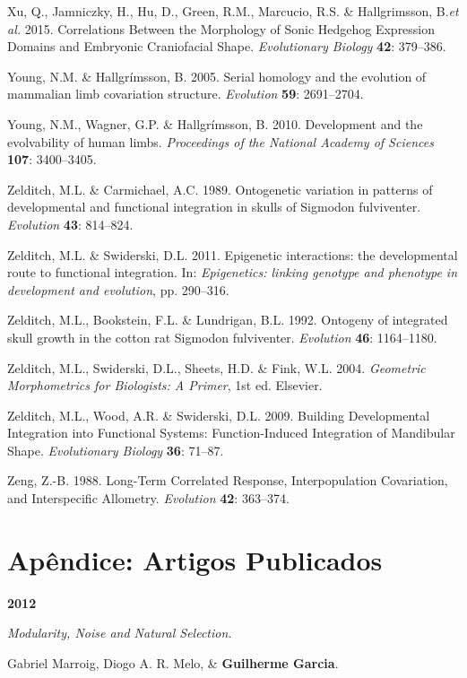 \documentclass[12pt,twoside]{report}
\begin{document}
Xu, Q., Jamniczky, H., Hu, D., Green, R.M., Marcucio, R.S. \&
Hallgrimsson, B.\emph{et al.} 2015. Correlations Between the Morphology
of Sonic Hedgehog Expression Domains and Embryonic Craniofacial Shape.
\emph{Evolutionary Biology} \textbf{42}: 379--386.

Young, N.M. \& Hallgrímsson, B. 2005. Serial homology and the evolution
of mammalian limb covariation structure. \emph{Evolution} \textbf{59}:
2691--2704.

Young, N.M., Wagner, G.P. \& Hallgrímsson, B. 2010. Development and the
evolvability of human limbs. \emph{Proceedings of the National Academy
of Sciences} \textbf{107}: 3400--3405.

Zelditch, M.L. \& Carmichael, A.C. 1989. Ontogenetic variation in
patterns of developmental and functional integration in skulls of
Sigmodon fulviventer. \emph{Evolution} \textbf{43}: 814--824.

Zelditch, M.L. \& Swiderski, D.L. 2011. Epigenetic interactions: the
developmental route to functional integration. In: \emph{Epigenetics:
linking genotype and phenotype in development and evolution}, pp.
290--316.

Zelditch, M.L., Bookstein, F.L. \& Lundrigan, B.L. 1992. Ontogeny of
integrated skull growth in the cotton rat Sigmodon fulviventer.
\emph{Evolution} \textbf{46}: 1164--1180.

Zelditch, M.L., Swiderski, D.L., Sheets, H.D. \& Fink, W.L. 2004.
\emph{Geometric Morphometrics for Biologists: A Primer}, 1st ed.
Elsevier.

Zelditch, M.L., Wood, A.R. \& Swiderski, D.L. 2009. Building
Developmental Integration into Functional Systems: Function-Induced
Integration of Mandibular Shape. \emph{Evolutionary Biology}
\textbf{36}: 71--87.

Zeng, Z.-B. 1988. Long-Term Correlated Response, Interpopulation
Covariation, and Interspecific Allometry. \emph{Evolution} \textbf{42}:
363--374.

\chapter*{Apêndice: Artigos Publicados}

\textbf {2012}

\textit {Modularity, Noise and Natural Selection.}

Gabriel Marroig, Diogo A. R. Melo, \& \textbf {Guilherme Garcia}.  
\end{document}
